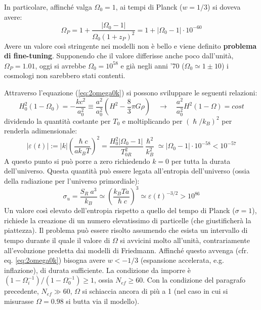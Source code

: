 In particolare, affinché valga $\Omega_0=1$, ai tempi di Planck ($w=1/3$) si doveva avere:
$$
    \Omega_P = 1+\frac{ \left| \Omega_0 -1 \right|}{\Omega_0(1+z_P)^2} = 1 + \left| \Omega_0 -1 \right|\cdot 10^{-60}
$$
Avere un valore così stringente nei modelli non è bello e viene definito \textbf{problema di fine-tuning}. Supponendo che il valore differisse anche poco dall'unità, $\Omega_P=1.01$, oggi si avrebbe $\Omega_0=10^{58}$ e già negli anni '70 ($\Omega_0\simeq 1 \pm 10$) i cosmologi non sarebbero stati contenti.

Attraverso l'equazione (\ref{eq:2omega0k}) si possono sviluppare le seguenti relazioni:
\begin{equation}
    H_0^2 \left ( 1-\Omega_0 \right ) = -\frac{kc^2}{a_0^2} \equiv \frac{a^2}{a_0^2} \left( H^2 - \frac{8}{3}\pi G \rho\right) \quad \rightarrow \quad \frac{a^2}{a_0^2} H^2 (1-\Omega) = cost
\end{equation}
dividendo la quantità costante per $T_0$ e moltiplicando per $(\hslash /k_B)^2$ per renderla adimensionale:
\begin{equation}
    |\varepsilon (t) | := |k| \left( \frac{\hslash c}{a k_B T}\right)^2 = \frac{H_0^2 |\Omega_0 -1|}{T_{0R}^2}\frac{\hslash^2}{k_B^2} \simeq | \Omega_0 -1 | \cdot 10^{-58} < 10^{-57}
\end{equation}
A questo punto si può porre a zero richiedendo $k=0$ per tutta la durata dell'universo. Questa quantità può essere legata all'entropia dell'universo (ossia della radiazione per l'universo primordiale):
\begin{equation}
    \sigma_u = \frac{S_R ~a^3}{k_B} \simeq \left( \frac{k_B Ta}{\hslash c} \right)^3 \simeq \varepsilon (t) ^{-3/2} > 10^{86}
\end{equation}
Un valore così elevato dell'entropia rispetto a quello del tempo di Planck ($\sigma=1$), richiede la creazione di un numero elevatissimo di particelle (che giustificherà la piattezza). 
Il problema può essere risolto assumendo che esista un intervallo di tempo durante il quale il valore di $\Omega$ si avvicini molto all'unità, contrariamente all'evoluzione predetta dai modelli di Friedmann. Affinché questo avvenga (cfr. eq. \ref{eq:2omega0k}) bisogna avere $w<-1/3$ (espansione accelerata, e.g. inflazione), di durata sufficiente. La condizione da imporre è $(1-\Omega_i^{-1})/(1-\Omega_0^{-1})\ge 1$, ossia $N_{ef}\ge 60$. Con la condizione del paragrafo precedente,  $N_{ef}\gg 60$, $\Omega$ si schiaccia ancora di più a 1 (nel caso in cui si misurasse $\Omega=0.98$ si butta via il modello).

